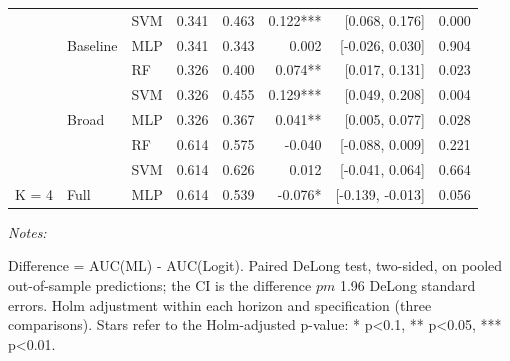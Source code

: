 \begin{table}
\begin{threeparttable}
\begin{tabular}[t]{lllrrrrr}
 &  & SVM & 0.341 & 0.463 & 0.122*** & {}[0.068, 0.176] & 0.000\\

 & \multirow[t]{-2}{*}[\normalbaselineskip]{\raggedright\arraybackslash Baseline} & MLP & 0.341 & 0.343 & 0.002 & {}[-0.026, 0.030] & 0.904\\

 &  & RF & 0.326 & 0.400 & 0.074** & {}[0.017, 0.131] & 0.023\\

 &  & SVM & 0.326 & 0.455 & 0.129*** & {}[0.049, 0.208] & 0.004\\

 & \multirow[t]{-2}{*}[\normalbaselineskip]{\raggedright\arraybackslash Broad} & MLP & 0.326 & 0.367 & 0.041** & {}[0.005, 0.077] & 0.028\\

 &  & RF & 0.614 & 0.575 & -0.040 & {}[-0.088, 0.009] & 0.221\\

 &  & SVM & 0.614 & 0.626 & 0.012 & {}[-0.041, 0.064] & 0.664\\

\multirow[t]{-8}{*}[\normalbaselineskip]{\raggedright\arraybackslash K = 4} & \multirow[t]{-2}{*}[\normalbaselineskip]{\raggedright\arraybackslash Full} & MLP & 0.614 & 0.539 & -0.076* & {}[-0.139, -0.013] & 0.056\\
\bottomrule
\end{tabular}
\begin{tablenotes}
\item \textit{Notes: } 
\item Difference = AUC(ML) - AUC(Logit). Paired DeLong test, two-sided, on pooled out-of-sample predictions; the CI is the difference $pm$ 1.96 DeLong standard errors. Holm adjustment within each horizon and specification (three comparisons). Stars refer to the Holm-adjusted p-value: * p<0.1, ** p<0.05, *** p<0.01.
\end{tablenotes}
\end{threeparttable}
\end{table}
